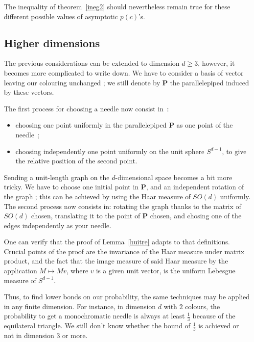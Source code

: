 \documentclass[a4paper,11pt]{article}
\theoremstyle{definition}
\theoremstyle{remark}
\begin{document}
The inequality of theorem~\ref{ineg2} should nevertheless remain true for these different possible values of asymptotic $p(c)$'s.

\subsection{Higher dimensions}
\label{dim}
The previous considerations can be extended to dimension $d \geq 3$, however, 
it becomes more complicated to write down. We have to consider a basis of 
vector leaving our colouring unchanged ; we still denote by $\mathbf{P}$ the 
parallelepiped induced by these vectors.

The first process for choosing a needle now consist in~: 
\begin{itemize}
	\item choosing one point uniformly in the parallelepiped $ \mathbf{P} $ as 
	one point of the needle~;
	\item choosing independently one point uniformly on the unit sphere 
	$S^{d-1}$, to give the relative position of the second point.
\end{itemize}

Sending a unit-length graph on the $d$-dimensional space becomes a bit more 
tricky. We have to choose one initial point in $ \mathbf{P} $, and an independent 
rotation of the graph ; this can be achieved 
by using the Haar measure of $SO(d)$ uniformly. The second process now consists 
in: rotating the graph thanks to the matrix of $SO(d)$ chosen, translating it 
to the point of $\mathbf{P}$ chosen, and chosing one of the 
edges independently as your needle.

One can verify that the proof of Lemma~\ref{huitre} adapts to that definitions. 
Crucial 
points of the proof are the invariance of the Haar measure under matrix product, and the 
fact that the image measure of said Haar measure by the application 
$M\mapsto Mv$, where $v$ is a given unit vector, is the uniform Lebesgue 
measure of $S^{d-1}$.

Thus, to find lower bonds on our probability, the same techniques may be applied 
in any finite dimension. For instance, in dimension $d$ with $2$ colours,
the probability to get a monochromatic  
needle is always at least $\frac{1}{3}$ because of the equilateral triangle. 
We still don't know whether the bound of $\frac{1}{3}$ is achieved or not in 
dimension $3$ or more.
\end{document}

